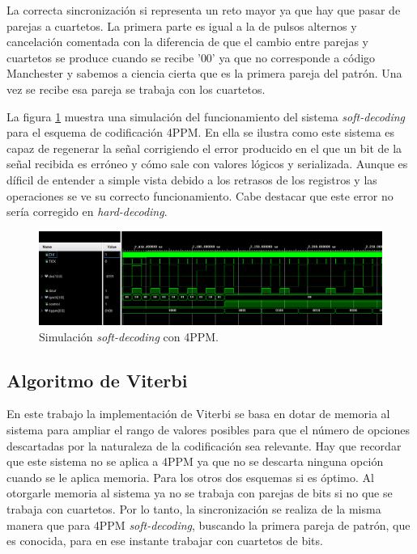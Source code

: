 La correcta sincronización si representa un reto mayor ya que hay que pasar de 
parejas a cuartetos. La primera parte es igual a la de pulsos alternos y cancelación
comentada con la diferencia de que el cambio entre parejas y cuartetos se produce
cuando se recibe '00' ya que no corresponde a código Manchester y sabemos a ciencia
cierta que es la primera pareja del patrón. Una vez se recibe esa pareja se trabaja
con los cuartetos.

La figura \ref{sim_4ppm} muestra una simulación del funcionamiento del sistema 
\textit{soft-decoding}
para el esquema de codificación 4PPM. En ella se ilustra como este sistema es capaz de 
regenerar la señal corrigiendo el error producido en el que un bit de la señal 
recibida es erróneo y cómo sale con valores lógicos y serializada. Aunque es 
díficil de entender a simple vista debido a los retrasos de los registros y las 
operaciones se ve su correcto funcionamiento.
Cabe destacar que este error no sería corregido en 
\textit{hard-decoding}.

\begin{figure}[ht]
    \centering
    \includegraphics[scale=0.35]{./figuras/sim_4ppm.png}
    \caption{\small{Simulación \textit{soft-decoding} con 4PPM.}}
    \label{sim_4ppm}%
\end{figure}

\subsection{Algoritmo de Viterbi}
En este trabajo la implementación de Viterbi se basa en dotar de memoria al sistema 
para ampliar el rango de valores posibles para que el número de opciones descartadas
por la naturaleza de la codificación sea relevante. Hay que recordar que este 
sistema no se aplica a 4PPM ya que no se descarta ninguna opción cuando se le aplica
memoria. Para los otros dos esquemas si es óptimo. Al otorgarle memoria al sistema
ya no se trabaja con parejas de bits si no que se trabaja con cuartetos. Por lo tanto,
la sincronización se realiza de la misma manera que para 4PPM \textit{soft-decoding},
buscando la primera pareja de patrón, que es conocida, para en ese instante trabajar
con cuartetos de bits.

